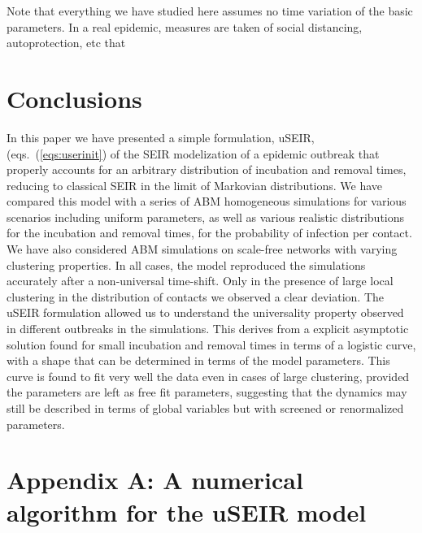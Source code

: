 \documentclass[a4paper,oneside,11pt]{article}
\begin{document}
Note that everything we have studied here assumes no time variation of the basic parameters. In a real epidemic, measures are taken of social distancing, autoprotection, etc that 

\section{Conclusions}
\label{sec:conclu}

In this paper we have presented a simple formulation, uSEIR,  (eqs.~(\ref{eqs:userinit}) of the SEIR modelization of a epidemic outbreak that properly accounts for an arbitrary distribution of incubation and removal times, reducing to classical SEIR in the limit of Markovian distributions.  We have compared this model with a series of ABM homogeneous simulations for various scenarios including uniform parameters, as well as various realistic distributions for the incubation and removal times,  for the probability of infection per contact. We have also considered ABM simulations on scale-free networks with varying 
 clustering properties. In all cases, the model reproduced the simulations accurately after a non-universal time-shift. Only in the presence of large local clustering in the distribution of contacts we observed a clear deviation. The uSEIR formulation allowed
us to understand the universality property observed in different outbreaks in the simulations. This derives from a explicit asymptotic solution found for small incubation and removal times in terms of a logistic curve, with a shape that can be determined in terms of the model parameters. This curve is found to fit very well the data  even in cases of large clustering, provided the parameters are left as free fit parameters, suggesting that the dynamics may still be described in terms of global variables but with  screened or renormalized parameters. 

\section*{Appendix A: A numerical algorithm for the uSEIR model}
\label{sec:appendix}
\end{document}
